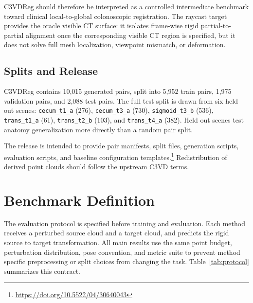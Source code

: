 \documentclass{bmvc2k}
\begin{document}
C3VDReg should therefore be interpreted as a controlled intermediate benchmark toward clinical local-to-global colonoscopic registration. The raycast target provides the oracle visible CT surface: it isolates frame-wise rigid partial-to-partial alignment once the corresponding visible CT region is specified, but it does not solve full mesh localization, viewpoint mismatch, or deformation.

\subsection{Splits and Release}
\label{sec:splits}

C3VDReg contains 10,015 generated pairs, split into 5,952 train pairs, 1,975 validation pairs, and 2,088 test pairs. The full test split is drawn from six held out scenes: \texttt{cecum\_t1\_a} (276), \texttt{cecum\_t3\_a} (730), \texttt{sigmoid\_t3\_b} (536), \texttt{trans\_t1\_a} (61), \texttt{trans\_t2\_b} (103), and \texttt{trans\_t4\_a} (382). Held out scenes test anatomy generalization more directly than a random pair split.

The release is intended to provide pair manifests, split files, generation scripts, evaluation scripts, and baseline configuration templates.\footnote{\url{https://doi.org/10.5522/04/30640043}} Redistribution of derived point clouds should follow the upstream C3VD terms.

\section{Benchmark Definition}
\label{sec:benchmark_definition}
\label{sec:protocol}

The evaluation protocol is specified before training and evaluation. Each method receives a perturbed source cloud and a target cloud, and predicts the rigid source to target transformation. All main results use the same point budget, perturbation distribution, pose convention, and metric suite to prevent method specific preprocessing or split choices from changing the task. Table~\ref{tab:protocol} summarizes this contract.
\end{document}
